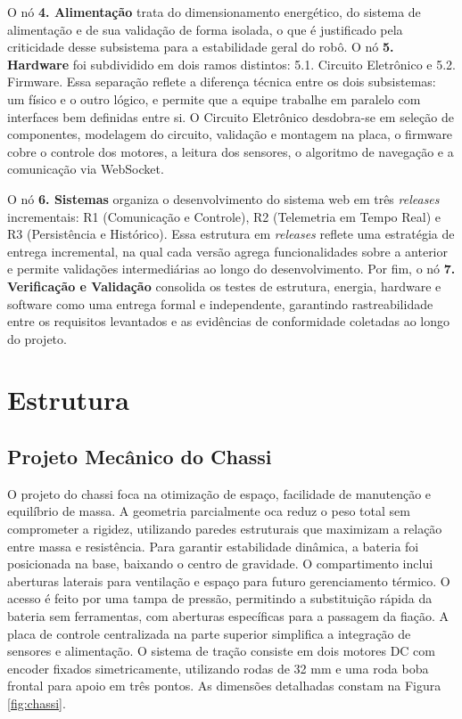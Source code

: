 O nó \textbf{4. Alimentação} trata do dimensionamento energético, do sistema de
alimentação e de sua validação de forma isolada, o que é justificado pela criticidade desse subsistema para a estabilidade geral do robô. O nó \textbf{5. Hardware} foi subdividido em dois ramos distintos: 5.1.
Circuito Eletrônico e 5.2. Firmware. Essa separação reflete a diferença técnica entre os dois subsistemas: um físico e o outro lógico, e permite
que a equipe trabalhe em paralelo com interfaces bem definidas entre si.
O Circuito Eletrônico desdobra-se em seleção de componentes, modelagem do
circuito, validação e montagem na placa, o firmware cobre o controle dos motores,
a leitura dos sensores, o algoritmo de navegação e a comunicação via WebSocket.

O nó \textbf{6. Sistemas} organiza o desenvolvimento do sistema web em três
\textit{releases} incrementais: R1 (Comunicação e Controle), R2 (Telemetria em
Tempo Real) e R3 (Persistência e Histórico). Essa estrutura em \textit{releases}
reflete uma estratégia de entrega incremental, na qual cada versão agrega
funcionalidades sobre a anterior e permite validações intermediárias ao longo do
desenvolvimento. Por fim, o nó \textbf{7. Verificação e Validação} consolida os testes
de estrutura, energia, hardware e software como uma entrega formal e independente,
garantindo rastreabilidade entre os requisitos levantados e as
evidências de conformidade coletadas ao longo do projeto.

\section{Estrutura}

\subsection{Projeto Mecânico do Chassi}

O projeto do chassi foca na otimização de espaço, facilidade de manutenção e equilíbrio de massa. A geometria parcialmente oca reduz o peso total sem comprometer a rigidez, utilizando paredes estruturais que maximizam a relação entre massa e resistência.
Para garantir estabilidade dinâmica, a bateria foi posicionada na base, baixando o centro de gravidade. O compartimento inclui aberturas laterais para ventilação e espaço para futuro gerenciamento térmico. O acesso é feito por uma tampa de pressão, permitindo a substituição rápida da bateria sem ferramentas, com aberturas específicas para a passagem da fiação.
A placa de controle centralizada na parte superior simplifica a integração de sensores e alimentação. O sistema de tração consiste em dois motores DC com encoder fixados simetricamente, utilizando rodas de 32 mm e uma roda boba frontal para apoio em três pontos. As dimensões detalhadas constam na Figura \ref{fig:chassi}.


